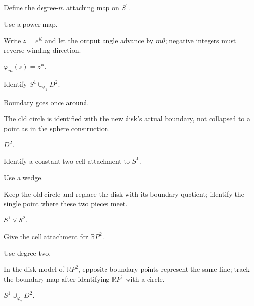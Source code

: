 \begin{exercise}\label{exr:viii05-12}
Define the degree-\(m\) attaching map on \(S^1\).
\end{exercise}
\begin{hint}
Use a power map.

Write \(z=e^{i\theta}\) and let the output angle advance by \(m\theta\); negative integers must reverse winding direction.
\end{hint}
\begin{solution}
\(\varphi_m(z)=z^m\).
\end{solution}

\begin{exercise}\label{exr:viii05-13}
Identify \(S^1\cup_{\varphi_1}D^2\).
\end{exercise}
\begin{hint}
Boundary goes once around.

The old circle is identified with the new disk's actual boundary, not collapsed to a point as in the sphere construction.
\end{hint}
\begin{solution}
\(D^2\).
\end{solution}

\begin{exercise}\label{exr:viii05-14}
Identify a constant two-cell attachment to \(S^1\).
\end{exercise}
\begin{hint}
Use a wedge.

Keep the old circle and replace the disk with its boundary quotient; identify the single point where these two pieces meet.
\end{hint}
\begin{solution}
\(S^1\vee S^2\).
\end{solution}

\begin{exercise}\label{exr:viii05-15}
Give the cell attachment for \(\mathbb RP^2\).
\end{exercise}
\begin{hint}
Use degree two.

In the disk model of \(\mathbb RP^2\), opposite boundary points represent the same line; track the boundary map after identifying \(\mathbb RP^1\) with a circle.
\end{hint}
\begin{solution}
\(S^1\cup_{\varphi_2}D^2\).
\end{solution}


